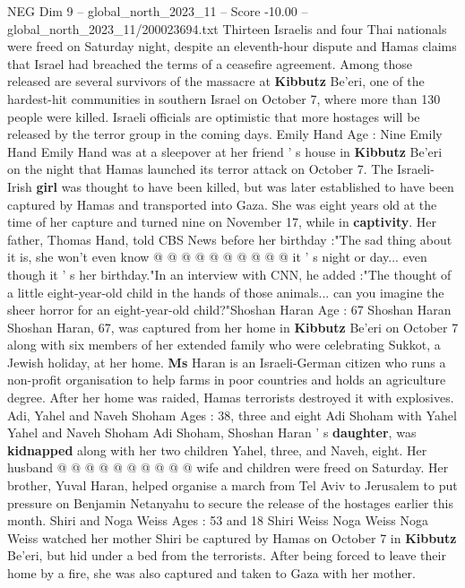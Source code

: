 \begin{textsample}{NEG Dim 9 – global\_north\_2023\_11 – Score -10.00 – global\_north\_2023\_11/200023694.txt}  \label{ex:f9_neg_062}
Thirteen Israelis and four Thai nationals were freed on Saturday night, despite an eleventh-hour dispute and Hamas claims that Israel had breached the terms of a ceasefire agreement.
Among those released are several survivors of the massacre at \textbf{Kibbutz} Be'eri, one of the hardest-hit communities in southern Israel on October 7, where more than 130 people were killed.
Israeli officials are optimistic that more hostages will be released by the terror group in the coming days.
Emily Hand Age : Nine Emily Hand Emily Hand was at a sleepover at her friend ' s house in \textbf{Kibbutz} Be'eri on the night that Hamas launched its terror attack on October 7.
The Israeli-Irish \textbf{girl} was thought to have been killed, but was later established to have been captured by Hamas and transported into Gaza.
She was eight years old at the time of her capture and turned nine on November 17, while in \textbf{captivity}.
Her father, Thomas Hand, told CBS News before her birthday :"The sad thing about it is, she won't even know @ @ @ @ @ @ @ @ @ @ it ' s night or day... even though it ' s her birthday."In an interview with CNN, he added :"The thought of a little eight-year-old child in the hands of those animals... can you imagine the sheer horror for an eight-year-old child?"Shoshan Haran Age : 67 Shoshan Haran Shoshan Haran, 67, was captured from her home in \textbf{Kibbutz} Be'eri on October 7 along with six members of her extended family who were celebrating Sukkot, a Jewish holiday, at her home. \textbf{Ms} Haran is an Israeli-German citizen who runs a non-profit organisation to help farms in poor countries and holds an agriculture degree.
After her home was raided, Hamas terrorists destroyed it with explosives.
Adi, Yahel and Naveh Shoham Ages : 38, three and eight Adi Shoham with Yahel Yahel and Naveh Shoham Adi Shoham, Shoshan Haran ' s \textbf{daughter}, was \textbf{kidnapped} along with her two children Yahel, three, and Naveh, eight.
Her husband @ @ @ @ @ @ @ @ @ @ wife and children were freed on Saturday.
Her brother, Yuval Haran, helped organise a march from Tel Aviv to Jerusalem to put pressure on Benjamin Netanyahu to secure the release of the hostages earlier this month.
Shiri and Noga Weiss Ages : 53 and 18 Shiri Weiss Noga Weiss Noga Weiss watched her mother Shiri be captured by Hamas on October 7 in \textbf{Kibbutz} Be'eri, but hid under a bed from the terrorists.
After being forced to leave their home by a fire, she was also captured and taken to Gaza with her mother.

\end{textsample}
